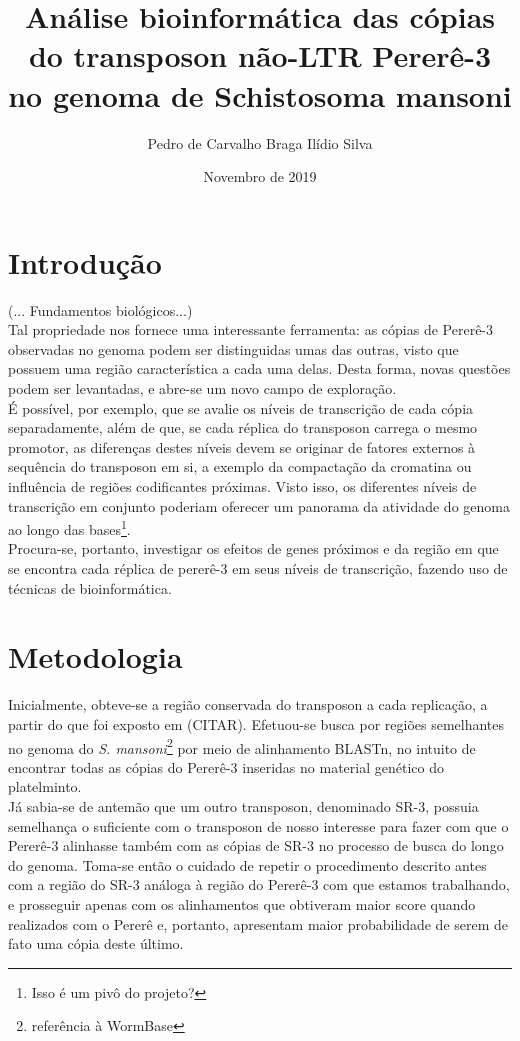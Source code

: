 \documentclass[12pt]{article}
\title{Análise bioinformática das cópias do transposon não-LTR Pererê-3 no genoma de Schistosoma mansoni}
\author{Pedro de Carvalho Braga Ilídio Silva}
\date{Novembro de 2019}
\begin{document}
\maketitle

\begin{multicols}{2}
\section{Introdução}
	(... Fundamentos biológicos...)\\
Tal propriedade nos fornece uma interessante ferramenta: as cópias de Pererê-3 observadas no genoma podem ser distinguidas umas das outras, visto que possuem uma região característica a cada uma delas. Desta forma, novas questões podem ser levantadas, e abre-se um novo campo de exploração.\\

É possível, por exemplo, que se avalie os níveis de transcrição de cada cópia separadamente, além de que, se cada réplica do transposon carrega o mesmo promotor, as diferenças destes níveis devem se originar de fatores externos à sequência do transposon em si, a exemplo da compactação da cromatina ou influência de regiões codificantes próximas. Visto isso, os diferentes níveis de transcrição em conjunto poderiam oferecer um panorama da atividade do genoma ao longo das bases\footnote{Isso é um pivô do projeto?}.\\

Procura-se, portanto, investigar os efeitos de genes próximos e da região em que se encontra cada réplica de pererê-3 em seus níveis de transcrição, fazendo uso de técnicas de bioinformática.

\section{Metodologia}
	Inicialmente, obteve-se a região conservada do transposon a cada replicação, a partir do que foi exposto em (CITAR). Efetuou-se busca por regiões semelhantes no genoma do \textit{S. mansoni}\footnote{referência à WormBase} por meio de alinhamento BLASTn, no intuito de encontrar todas as cópias do Pererê-3 inseridas no material genético do platelminto.\\

	Já sabia-se de antemão que um outro transposon, denominado SR-3, possuia semelhança o suficiente com o transposon de nosso interesse para fazer com que o Pererê-3 alinhasse também com as cópias de SR-3 no processo de busca do longo do genoma. Toma-se então o cuidado de repetir o procedimento descrito antes com a região do SR-3 análoga à região do Pererê-3 com que estamos trabalhando, e prosseguir apenas com os alinhamentos que obtiveram maior score quando realizados com o Pererê e, portanto, apresentam maior probabilidade de serem de fato uma cópia deste último.\\


\end{multicols}
\end{document}
